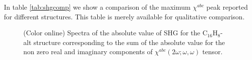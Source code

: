 \documentclass[pss]{wiley2sp} %
\begin{document}
In table \ref{tab:shgcomp} we show a comparison of the maximum $\chi^{abc}$
peak reported for different structures. This table is merely available for
qualitative comparison.

\begin{figure}[t]
\caption{(Color online) Spectra of the absolute value of SHG for the
    C$_{16}$H$_{8}$-alt structure corresponding to the
    sum of the absolute value for the non zero real and imaginary components
    of $\chi^{abc}(2\omega;\omega,
    \omega) $ tensor.\label{fig:alt-shg-abs}}
\end{figure}
\end{document}
